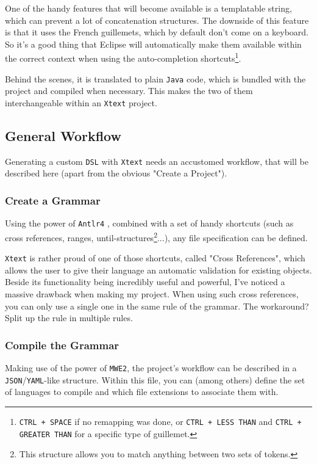 \documentclass[review]{elsarticle}
\begin{document}
One of the handy features that will become available is a templatable string, which can prevent a lot of concatenation structures. The downside of this feature is that it uses the \textsf{French guillemets}, which by default don't come on a keyboard. So it's a good thing that \textsf{Eclipse} will automatically make them available within the correct context when using the auto-completion shortcuts\footnote{\texttt{CTRL + SPACE} if no remapping was done, or \texttt{CTRL + LESS THAN} and \texttt{CTRL + GREATER THAN} for a specific type of guillemet.}.

Behind the scenes, it is translated to plain \texttt{Java} code, which is bundled with the project and compiled when necessary. This makes the two of them interchangeable within an \texttt{Xtext} project.

\subsection{General Workflow}
Generating a custom \texttt{DSL} with \texttt{Xtext} needs an accustomed workflow, that will be described here (apart from the obvious "\textsf{Create a Project}").

\subsubsection{Create a Grammar}
Using the power of \texttt{Antlr4} \cite{antlr}, combined with a set of handy shortcuts (such as cross references, ranges, until-structures\footnote{This structure allows you to match anything between two sets of tokens.}...), any file specification can be defined.

\texttt{Xtext} is rather proud of one of those shortcuts, called "\textsf{Cross References}", which allows the user to give their language an automatic validation for existing objects. Beside its functionality being incredibly useful and powerful, I've noticed a massive drawback when making my project. When using such cross references, you can only use a single one in the same rule of the grammar. The workaround? Split up the rule in multiple rules.

\subsubsection{Compile the Grammar}
Making use of the power of \texttt{MWE2}, the project's workflow can be described in a \texttt{JSON}/\texttt{YAML}-like structure. Within this file, you can (among others) define the set of languages to compile and which file extensions to associate them with.
\end{document}
